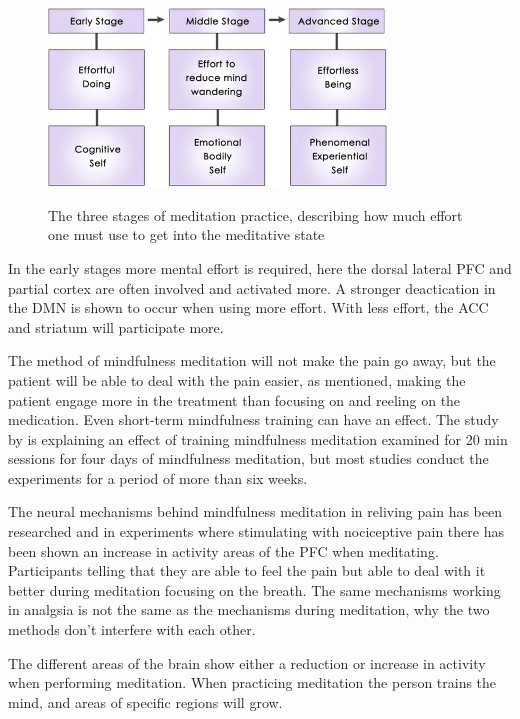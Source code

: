 \begin{figure}[H]
	\includegraphics[width=0.8\textwidth]{figures/stages_of_meditation.png} 
	\caption{The three stages of meditation practice, describing how much effort one must use to get into the meditative state}
	\label{fig:meditation_stages}  
	\cite{Tang2017}
\end{figure}  

In the early stages more mental effort is required, here the dorsal lateral PFC and partial cortex are often involved and activated more. A stronger deactication in the DMN is shown to occur when using more effort. With less effort, the ACC and striatum will participate more. \cite{Tang2017}

The method of mindfulness meditation will not make the pain go away, but the patient will be able to deal with the pain easier, as mentioned, making the patient engage more in the treatment than focusing on and reeling on the medication. \cite{Jacob2016}
Even short-term mindfulness training can have an effect. The study by \cite{Zeidan2012} is explaining an effect of training mindfulness meditation examined for 20 min sessions for four days of mindfulness meditation, but most studies conduct the experiments for a period of more than six weeks. \cite{Zeidan2012}

The neural mechanisms behind mindfulness meditation in reliving pain has been researched and in experiments where stimulating with nociceptive pain there has been shown an increase in activity areas of the PFC when meditating. Participants telling that they are able to feel the pain but able to deal with it better during meditation focusing on the breath. 
The same mechanisms working in analgsia is not the same as the mechanisms during meditation, why the two methods don't interfere with each other. \cite{Jacob2016}

The different areas of the brain show either a reduction or increase in activity when performing meditation. When practicing meditation the person trains the mind, and areas of specific regions will grow. \cite{Zeidan2012}

